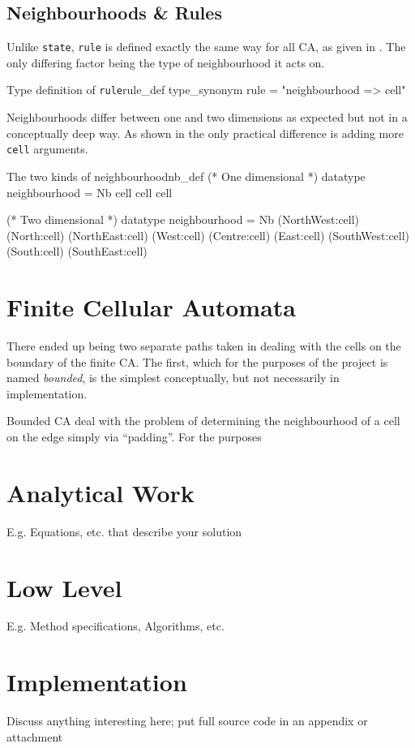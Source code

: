 \subsection{Neighbourhoods \& Rules}

Unlike \texttt{state},
\texttt{rule} is defined exactly the same way for all CA, as given in .
The only differing factor being the type of neighbourhood it acts on.

\begin{myminted}{Type definition of \texttt{rule}}{rule_def}
    type_synonym rule = "neighbourhood => cell"
\end{myminted}

Neighbourhoods differ between one and two dimensions as expected but not in a conceptually deep way.
As shown in  the only practical difference is adding more \texttt{cell} arguments.

\begin{myminted}{The two kinds of neighbourhood}{nb_def}
    (* One dimensional *)
    datatype neighbourhood = Nb cell cell cell

    (* Two dimensional *)
    datatype neighbourhood = Nb
    (NorthWest:cell) (North:cell)  (NorthEast:cell)
    (West:cell)      (Centre:cell) (East:cell)
    (SouthWest:cell) (South:cell)  (SouthEast:cell)
\end{myminted}

\section{Finite Cellular Automata}

There ended up being two separate paths taken in dealing with the cells on the boundary of the finite CA.
The first,
which for the purposes of the project is named \emph{bounded},
is the simplest conceptually,
but not necessarily in implementation.

Bounded CA deal with the problem of determining the neighbourhood of a cell on the edge simply via ``padding''.
For the purposes 








\section{Analytical Work}

E.g. Equations, etc. that describe your solution


\section{Low Level}

E.g. Method specifications, Algorithms, etc.


\section{Implementation}

Discuss anything interesting here; put full source code in an appendix or attachment

